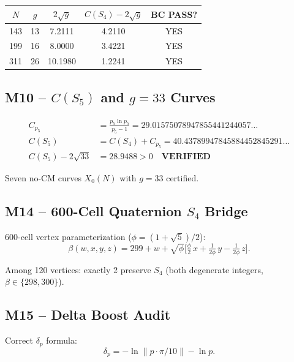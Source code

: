 \documentclass[12pt,letterpaper]{article}
\begin{document}
\begin{center}
\begin{tabular}{ccccc}
\toprule
$N$ & $g$ & $2\sqrt{g}$ & $C(S_4) - 2\sqrt{g}$ & BC PASS? \\
\midrule
143 & 13 & 7.2111 & 4.2110 & YES \\
199 & 16 & 8.0000 & 3.4221 & YES \\
311 & 26 & 10.1980 & 1.2241 & YES \\
\bottomrule
\end{tabular}
\end{center}

\subsection{M10 -- $C(S_5)$ and $g = 33$ Curves}

\begin{align}
  C_{p_5} &= \frac{p_5 \ln p_5}{p_5 - 1}
    = 29.01575078947855441244057\ldots \\
  C(S_5) &= C(S_4) + C_{p_5}
    = 40.43789947845884452845291\ldots \label{eq:CS5}\\
  C(S_5) - 2\sqrt{33} &= 28.9488 > 0 \quad\textbf{VERIFIED}
\end{align}

Seven no-CM curves $X_0(N)$ with $g = 33$ certified.

\subsection{M14 -- 600-Cell Quaternion $S_4$ Bridge}

600-cell vertex parameterization ($\phi = (1+\sqrt{5})/2$):
\begin{equation}
  \beta(w,x,y,z) = 299 + w
  + \sqrt{\phi}\bigl[\tfrac{\phi}{2}\,x
  + \tfrac{1}{2\phi}\,y - \tfrac{1}{2\phi}\,z\bigr].
  \label{eq:beta600}
\end{equation}

Among 120 vertices: exactly 2 preserve $S_4$
(both degenerate integers, $\beta \in \{298, 300\}$).

\subsection{M15 -- Delta Boost Audit}

Correct $\delta_p$ formula:
\begin{equation}
  \delta_p = -\ln\|p \cdot \pi/10\| - \ln p.
  \label{eq:deltap}
\end{equation}
\end{document}
